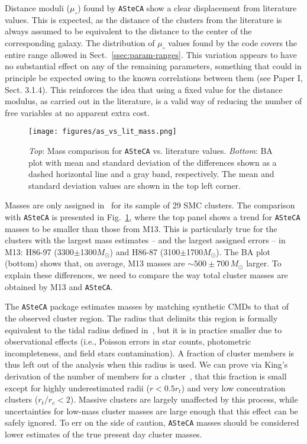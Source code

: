 \documentclass{aa}
\begin{document}
Distance moduli ($\mu_{\circ}$) found by \texttt{ASteCA} show a clear
displacement from literature values. This is expected, as the distance of the
clusters from the literature is always assumed to be equivalent to the
distance to the center of the corresponding galaxy.
The distribution of $\mu_{\circ}$ values found by the code covers the entire
range allowed in Sect.~\ref{ssec:param-ranges}.
%
This variation appears to have no substantial effect on
any of the remaining parameters, something that could in principle be expected
owing to the known correlations between them (see Paper I, Sect. 3.1.4).
This reinforces the idea that using a fixed value for the distance modulus, as
carried out in the literature, is a valid way of reducing the number of free variables
at no apparent extra cost.\\

\begin{figure}
\centering
\texttt{[image: figures/as\_vs\_lit\_mass.png]}
\caption{\emph{Top}: Mass comparison for \texttt{ASteCA} vs. literature
values.
\emph{Bottom}: BA plot with mean and standard deviation of the differences
shown as a dashed horizontal line and a gray band, respectively. The mean and
standard deviation values are shown in the top left corner.}
\label{fig:as_vs_lit_mass}
\end{figure}

Masses are only assigned in~\citet[][M13]{Maia_2013} for its sample of 29
SMC clusters. The comparison with \texttt{ASteCA} is presented in
Fig.~\ref{fig:as_vs_lit_mass}, where the top panel shows a trend for
\texttt{ASteCA} masses to be smaller than those from M13. This is particularly
true for the clusters with the largest mass estimates -- and the largest
assigned errors -- in M13: H86-97 (3300$\pm$1300$M_{\odot}$) and H86-87
(3100$\pm$1700$M_{\odot}$). The BA plot (bottom) shows that, on average, M13
masses are ${\sim}500{\pm}700\,M_{\odot}$ larger.
%
To explain these differences, we need to compare the way total cluster masses
are obtained by M13 and \texttt{ASteCA}.

The \texttt{ASteCA} package estimates masses by matching synthetic CMDs
to that of the observed cluster region.
The radius that delimits this region is formally equivalent to the
tidal radius defined in~\cite[][see Sect.~\ref{ssec:centre-radius}]{King_1962},
but it is in practice smaller due to observational effects (i.e., Poisson
errors in star counts, photometric incompleteness, and field stars contamination).
%
A fraction of cluster members is thus left out of the analysis when this radius
is used. We can prove via King's derivation of the number of
members for a cluster~\citep[Eq. 18,][]{King_1962}, that this fraction is small
except for highly underestimated radii ($r{<}0.5r_t$) and very low concentration
clusters ($r_t/r_c{<}2$).
%
Massive clusters are largely unaffected by this process, while uncertainties for
low-mass cluster masses are large enough that this effect can be safely
ignored. To err on the side of caution, \texttt{ASteCA} masses should be
considered lower estimates of the true present day cluster masses.
\end{document}
